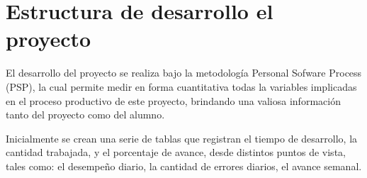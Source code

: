 \documentclass[a4paper,12pt,openany,oneside]{book}
\begin{document}

\section{Estructura de desarrollo el proyecto}
El desarrollo del proyecto se realiza bajo la metodología Personal Sofware Process (PSP), la cual permite medir en forma cuantitativa todas la variables implicadas en el proceso productivo de este proyecto, brindando una valiosa información tanto del proyecto como del alumno.

Inicialmente se crean una serie de tablas que registran el tiempo de desarrollo, la cantidad trabajada, y el porcentaje de avance, desde distintos puntos de vista, tales como: el desempeño diario, la cantidad de errores diarios, el avance semanal.
\end{document}
